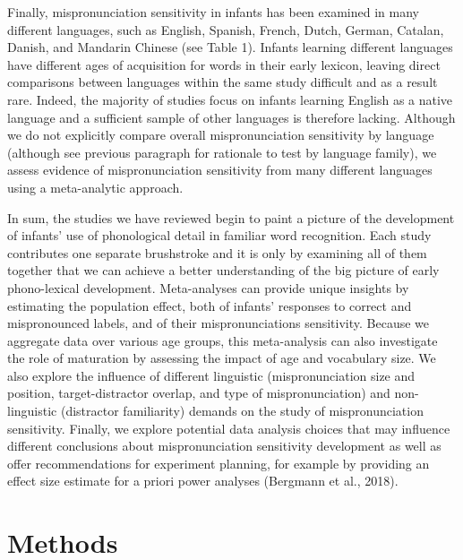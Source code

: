 \documentclass[man]{apa6}
\begin{document}
Finally, mispronunciation sensitivity in infants has been examined in many different languages, such as English, Spanish, French, Dutch, German, Catalan, Danish, and Mandarin Chinese (see Table 1). Infants learning different languages have different ages of acquisition for words in their early lexicon, leaving direct comparisons between languages within the same study difficult and as a result rare. Indeed, the majority of studies focus on infants learning English as a native language and a sufficient sample of other languages is therefore lacking. Although we do not explicitly compare overall mispronunciation sensitivity by language (although see previous paragraph for rationale to test by language family), we assess evidence of mispronunciation sensitivity from many different languages using a meta-analytic approach.

In sum, the studies we have reviewed begin to paint a picture of the development of infants' use of phonological detail in familiar word recognition. Each study contributes one separate brushstroke and it is only by examining all of them together that we can achieve a better understanding of the big picture of early phono-lexical development. Meta-analyses can provide unique insights by estimating the population effect, both of infants' responses to correct and mispronounced labels, and of their mispronunciations sensitivity. Because we aggregate data over various age groups, this meta-analysis can also investigate the role of maturation by assessing the impact of age and vocabulary size. We also explore the influence of different linguistic (mispronunciation size and position, target-distractor overlap, and type of mispronunciation) and non-linguistic (distractor familiarity) demands on the study of mispronunciation sensitivity. Finally, we explore potential data analysis choices that may influence different conclusions about mispronunciation sensitivity development as well as offer recommendations for experiment planning, for example by providing an effect size estimate for a priori power analyses (Bergmann et al., 2018).

\hypertarget{methods}{%
\section{Methods}\label{methods}}
\end{document}
